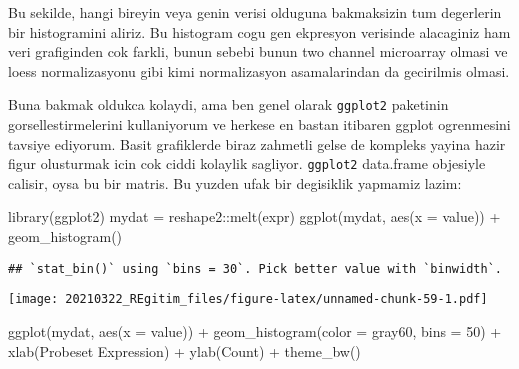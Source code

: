 \documentclass[
]{book}
\newenvironment{Shaded}{\begin{snugshade}}{\end{snugshade}}
\newcommand{\AttributeTok}[1]{\textcolor[rgb]{0.77,0.63,0.00}{#1}}
\newcommand{\DecValTok}[1]{\textcolor[rgb]{0.00,0.00,0.81}{#1}}
\newcommand{\FunctionTok}[1]{\textcolor[rgb]{0.00,0.00,0.00}{#1}}
\newcommand{\NormalTok}[1]{#1}
\newcommand{\OtherTok}[1]{\textcolor[rgb]{0.56,0.35,0.01}{#1}}
\newcommand{\SpecialCharTok}[1]{\textcolor[rgb]{0.00,0.00,0.00}{#1}}
\newcommand{\StringTok}[1]{\textcolor[rgb]{0.31,0.60,0.02}{#1}}
\begin{document}
Bu sekilde, hangi bireyin veya genin verisi olduguna bakmaksizin tum degerlerin bir histogramini aliriz. Bu histogram cogu gen ekpresyon verisinde alacaginiz ham veri grafiginden cok farkli, bunun sebebi bunun two channel microarray olmasi ve loess normalizasyonu gibi kimi normalizasyon asamalarindan da gecirilmis olmasi.

Buna bakmak oldukca kolaydi, ama ben genel olarak \texttt{ggplot2} paketinin gorsellestirmelerini kullaniyorum ve herkese en bastan itibaren ggplot ogrenmesini tavsiye ediyorum. Basit grafiklerde biraz zahmetli gelse de kompleks yayina hazir figur olusturmak icin cok ciddi kolaylik sagliyor. \texttt{ggplot2} data.frame objesiyle calisir, oysa bu bir matris. Bu yuzden ufak bir degisiklik yapmamiz lazim:

\begin{Shaded}
\begin{Highlighting}[]
\FunctionTok{library}\NormalTok{(ggplot2)}
\NormalTok{mydat }\OtherTok{=}\NormalTok{ reshape2}\SpecialCharTok{::}\FunctionTok{melt}\NormalTok{(expr)}
\FunctionTok{ggplot}\NormalTok{(mydat, }\FunctionTok{aes}\NormalTok{(}\AttributeTok{x =}\NormalTok{ value)) }\SpecialCharTok{+}
  \FunctionTok{geom\_histogram}\NormalTok{()}
\end{Highlighting}
\end{Shaded}

\begin{verbatim}
## `stat_bin()` using `bins = 30`. Pick better value with `binwidth`.
\end{verbatim}

\texttt{[image: 20210322\_REgitim\_files/figure-latex/unnamed-chunk-59-1.pdf]}

\begin{Shaded}
\begin{Highlighting}[]
\FunctionTok{ggplot}\NormalTok{(mydat, }\FunctionTok{aes}\NormalTok{(}\AttributeTok{x =}\NormalTok{ value)) }\SpecialCharTok{+}
  \FunctionTok{geom\_histogram}\NormalTok{(}\AttributeTok{color =} \StringTok{\textquotesingle{}gray60\textquotesingle{}}\NormalTok{, }\AttributeTok{bins =} \DecValTok{50}\NormalTok{) }\SpecialCharTok{+}
  \FunctionTok{xlab}\NormalTok{(}\StringTok{\textquotesingle{}Probeset Expression\textquotesingle{}}\NormalTok{) }\SpecialCharTok{+}
  \FunctionTok{ylab}\NormalTok{(}\StringTok{\textquotesingle{}Count\textquotesingle{}}\NormalTok{) }\SpecialCharTok{+}
  \FunctionTok{theme\_bw}\NormalTok{()}
\end{Highlighting}
\end{Shaded}
\end{document}
